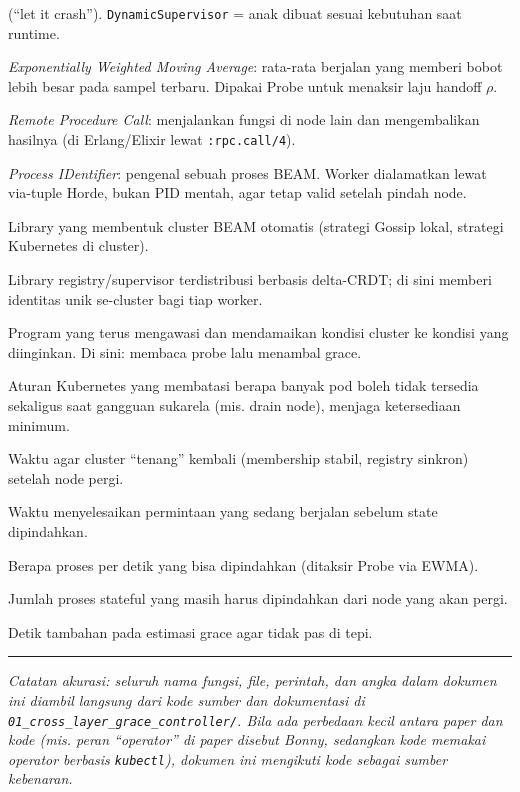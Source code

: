\documentclass[11pt]{article}
\newcommand{\code}[1]{\texttt{\small #1}}
\begin{document}
\begin{description}[leftmargin=1.6em,style=nextline]
  (``let it crash''). \code{DynamicSupervisor} = anak dibuat sesuai kebutuhan saat runtime.
  \item[EWMA] \emph{Exponentially Weighted Moving Average}: rata-rata berjalan yang memberi bobot lebih
  besar pada sampel terbaru. Dipakai Probe untuk menaksir laju handoff $\rho$.
  \item[RPC] \emph{Remote Procedure Call}: menjalankan fungsi di node lain dan mengembalikan hasilnya
  (di Erlang/Elixir lewat \code{:rpc.call/4}).
  \item[PID] \emph{Process IDentifier}: pengenal sebuah proses BEAM. Worker dialamatkan lewat via-tuple
  Horde, bukan PID mentah, agar tetap valid setelah pindah node.
  \item[libcluster] Library yang membentuk cluster BEAM otomatis (strategi Gossip lokal, strategi
  Kubernetes di cluster).
  \item[Horde] Library registry/supervisor terdistribusi berbasis delta-CRDT; di sini memberi identitas
  unik se-cluster bagi tiap worker.
  \item[operator] Program yang terus mengawasi dan mendamaikan kondisi cluster ke kondisi yang
  diinginkan. Di sini: membaca probe lalu menambal grace.
  \item[PodDisruptionBudget (PDB)] Aturan Kubernetes yang membatasi berapa banyak pod boleh tidak
  tersedia sekaligus saat gangguan sukarela (mis. drain node), menjaga ketersediaan minimum.
  \item[$T_c$ (waktu konvergensi)] Waktu agar cluster ``tenang'' kembali (membership stabil, registry
  sinkron) setelah node pergi.
  \item[$T_d$ (waktu drain)] Waktu menyelesaikan permintaan yang sedang berjalan sebelum state
  dipindahkan.
  \item[$\rho$ (laju handoff)] Berapa proses per detik yang bisa dipindahkan (ditaksir Probe via EWMA).
  \item[$|H|$ (backlog)] Jumlah proses stateful yang masih harus dipindahkan dari node yang akan pergi.
  \item[$\sigma$ (margin keamanan)] Detik tambahan pada estimasi grace agar tidak pas di tepi.
\end{description}

\bigskip
\hrule
\medskip
\noindent\emph{Catatan akurasi: seluruh nama fungsi, file, perintah, dan angka dalam dokumen ini
diambil langsung dari kode sumber dan dokumentasi di
\code{01\_cross\_layer\_grace\_controller/}. Bila ada perbedaan kecil antara paper dan kode
(mis. peran ``operator'' di paper disebut Bonny, sedangkan kode memakai operator berbasis
\code{kubectl}), dokumen ini mengikuti \emph{kode} sebagai sumber kebenaran.}
\end{document}
